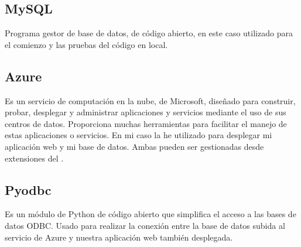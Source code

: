 \subsection{MySQL}
Programa gestor de base de datos, de código abierto, en este caso utilizado para el comienzo y las pruebas del código en local.

\subsection{Azure}
Es un servicio de computación en la nube, de Microsoft, diseñado para construir, probar, desplegar y administrar aplicaciones y servicios mediante el uso de sus centros de datos. Proporciona muchas herramientas para facilitar el manejo de estas aplicaciones o servicios. En mi caso la he utilizado para desplegar mi aplicación web y mi base de datos. Ambas pueden ser gestionadas desde extensiones del .

\subsection{Pyodbc}
Es un módulo de Python de código abierto que simplifica el acceso a las bases de datos ODBC. Usado para realizar la conexión entre la base de datos subida al servicio de Azure y nuestra aplicación web también desplegada.

